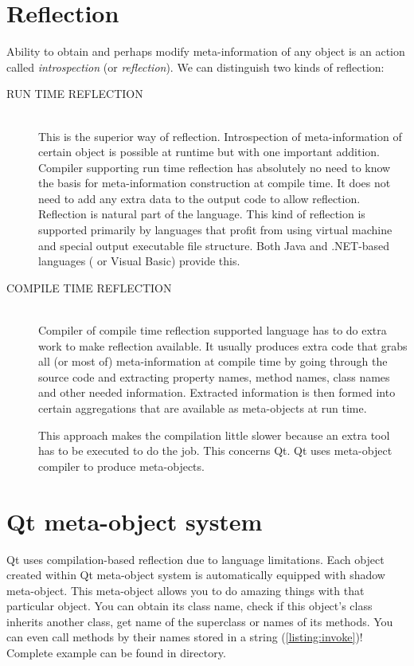 \section{Reflection}
Ability to obtain and perhaps modify meta-information of any object is an action called \textit{introspection} (or \textit{reflection}). We can distinguish two kinds of reflection:
\begin{description}
\item[RUN TIME REFLECTION] \hfill \\
This is the superior way of reflection. Introspection of meta-information of certain object is possible at runtime but with one important addition. Compiler supporting run time reflection has absolutely no need to know the basis for meta-information construction at compile time. It does not need to add any extra data to the output code to allow reflection. Reflection is natural part of the language. This kind of reflection is supported primarily by languages that profit from using virtual machine and special output executable file structure. Both Java and .NET-based languages (\eg \csharp{} or Visual Basic) \citep[p.~333]{nigel:csharp} provide this.
\item[COMPILE TIME REFLECTION] \hfill \\
Compiler of compile time reflection supported language has to do extra work to make reflection available. It usually produces extra code that grabs all (or most of) meta-information at compile time by going through the source code and extracting property names, method names, class names and other needed information. Extracted information is then formed into certain aggregations that are available as meta-objects at run time.

This approach makes the compilation little slower because an extra tool has to be executed to do the job. This concerns Qt. Qt uses meta-object compiler to produce meta-objects.
\end{description}

\section{Qt meta-object system}
Qt uses compilation-based reflection due to \cpp{} language limitations. Each object created within Qt meta-object system is automatically equipped with shadow meta-object. This meta-object allows you to do amazing things with that particular object. You can obtain its class name, check if this object's class inherits another class, get name of the superclass or names of its methods. You can even call methods by their names stored in a string (\autoref{listing:invoke})! Complete example can be found in directory.

